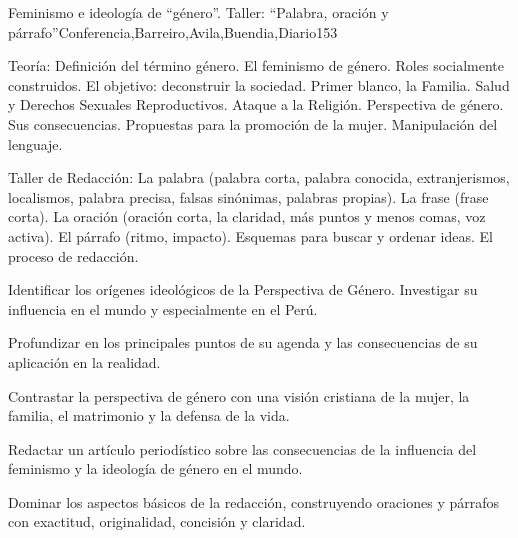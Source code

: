 \begin{syllabus}
\begin{unit}{Feminismo e ideología de ``género''. Taller: ``Palabra, oración y párrafo''}{Conferencia,Barreiro,Avila,Buendia,Diario}{15}{3}
\begin{topics}
	\item Teoría: 
		\subitem Definición del término género. El feminismo de género. Roles socialmente construidos. El objetivo: deconstruir la sociedad. Primer blanco, la Familia. Salud y Derechos Sexuales Reproductivos. Ataque a la Religión.
		\subitem Perspectiva de género. Sus consecuencias. Propuestas para la promoción de la mujer.
		\subitem Manipulación del lenguaje.

	\item Taller de Redacción:
 		\subitem La palabra (palabra corta, palabra conocida, extranjerismos, localismos, palabra precisa, falsas sinónimas, palabras propias).
 		\subitem La frase (frase corta).
 		\subitem La oración (oración corta, la claridad, más puntos y menos comas, voz activa).
 		\subitem El párrafo (ritmo, impacto). 
 		\subitem Esquemas para buscar y ordenar ideas.
 		\subitem El proceso de redacción.
\end{topics}
\begin{unitgoals}
	\item Identificar los orígenes ideológicos de la Perspectiva de Género. Investigar su influencia en el mundo y especialmente en el Perú. 	
	\item Profundizar en los principales puntos de su agenda y las consecuencias de su aplicación en la realidad. 	
	\item Contrastar la perspectiva de género con una visión cristiana de la mujer, la familia, el matrimonio y la defensa de la vida.
	\item Redactar un artículo periodístico sobre las consecuencias de la influencia del feminismo y la ideología de género en el mundo. 	
	\item Dominar los aspectos básicos de la redacción, construyendo oraciones y párrafos con exactitud, originalidad, concisión y claridad.

\end{unitgoals}
\end{unit}


\end{syllabus}
